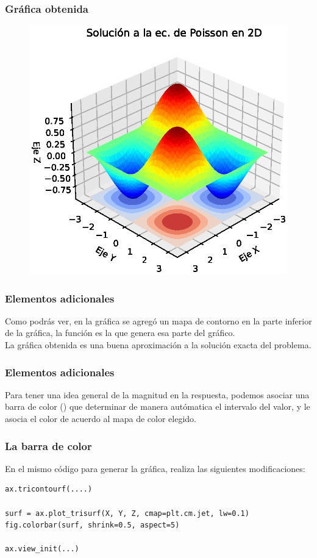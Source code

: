 \documentclass[12pt]{beamer}
\begin{document}
{
\begin{frame}
\frametitle{Gráfica obtenida}
\begin{figure}[h!]
   \centering
   \includegraphics[scale=0.55]{Imagenes/plot_Ejercicio_Ec_PoissonXY_01.eps}
\end{figure}
\end{frame}
}
\begin{frame}
\frametitle{Elementos adicionales}
Como podrás ver, en la gráfica se agregó un mapa de contorno en la parte inferior de la gráfica, la función  es la que genera esa parte del gráfico.
\\
\bigskip
\pause
La gráfica obtenida es una buena aproximación a la solución exacta del problema.
\end{frame}
\begin{frame}
\frametitle{Elementos adicionales}
Para tener una idea general de la magnitud en la respuesta, podemos asociar una barra de color () que determinar de manera autómatica el intervalo del valor, y le asocia el color de acuerdo al mapa de color elegido.
\end{frame}
\begin{frame}[fragile]
\frametitle{La barra de color}
En el mismo código para generar la gráfica, realiza las siguientes modificaciones:
\pause
\begin{lstlisting}[caption=Cambios en el código de la gráfica]
ax.tricontourf(....)

surf = ax.plot_trisurf(X, Y, Z, cmap=plt.cm.jet, lw=0.1)
fig.colorbar(surf, shrink=0.5, aspect=5)

ax.view_init(...)
\end{lstlisting}
\end{frame}
\end{document}
